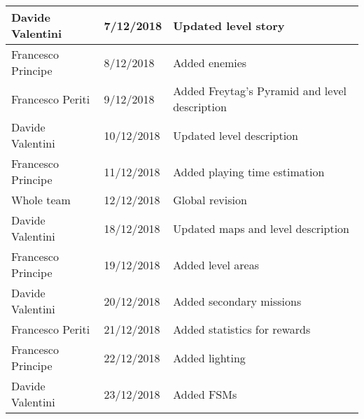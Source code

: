 \begin{longtable}[H]{|l|l|l|}
Davide Valentini & 7/12/2018 & Updated level story \\ \hline
Francesco Principe & 8/12/2018 & Added enemies \\ \hline
Francesco Periti & 9/12/2018 & Added Freytag's Pyramid and level description \\ \hline
Davide Valentini & 10/12/2018 & Updated level description \\ \hline
Francesco Principe & 11/12/2018 & Added playing time estimation \\ \hline
Whole team & 12/12/2018 & Global revision \\ \hline

Davide Valentini & 18/12/2018 & Updated maps and level description \\ \hline
Francesco Principe & 19/12/2018 & Added level areas \\ \hline
Davide Valentini & 20/12/2018 & Added secondary missions \\ \hline
Francesco Periti & 21/12/2018 & Added statistics for rewards \\ \hline
Francesco Principe & 22/12/2018 & Added lighting \\ \hline
Davide Valentini & 23/12/2018 & Added FSMs \\ \hline
\end{longtable}
